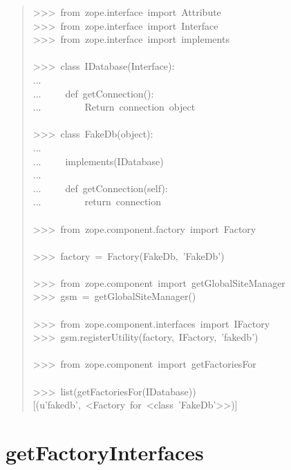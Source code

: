 \documentclass[14pt,a4paper,openany,twoside,final]{extbook}
\begin{document}
\begin{quote}{\ttfamily \raggedright \noindent
>{}>{}>~from~zope.interface~import~Attribute\\
>{}>{}>~from~zope.interface~import~Interface\\
>{}>{}>~from~zope.interface~import~implements\\
~\\
>{}>{}>~class~IDatabase(Interface):\\
...\\
...~~~~~def~getConnection():\\
...~~~~~~~~~\textquotedbl{}\textquotedbl{}\textquotedbl{}Return~connection~object\textquotedbl{}\textquotedbl{}\textquotedbl{}\\
~\\
>{}>{}>~class~FakeDb(object):\\
...\\
...~~~~~implements(IDatabase)\\
...\\
...~~~~~def~getConnection(self):\\
...~~~~~~~~~return~\textquotedbl{}connection\textquotedbl{}\\
~\\
>{}>{}>~from~zope.component.factory~import~Factory\\
~\\
>{}>{}>~factory~=~Factory(FakeDb,~'FakeDb')\\
~\\
>{}>{}>~from~zope.component~import~getGlobalSiteManager\\
>{}>{}>~gsm~=~getGlobalSiteManager()\\
~\\
>{}>{}>~from~zope.component.interfaces~import~IFactory\\
>{}>{}>~gsm.registerUtility(factory,~IFactory,~'fakedb')\\
~\\
>{}>{}>~from~zope.component~import~getFactoriesFor\\
~\\
>{}>{}>~list(getFactoriesFor(IDatabase))\\
{[}(u'fakedb',~<Factory~for~<class~'FakeDb'>{}>){]}
}
\end{quote}


\section*{getFactoryInterfaces%
  \label{getfactoryinterfaces}%
}
\end{document}
